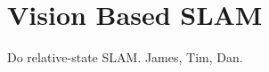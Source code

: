
\chapter{Vision Based SLAM}
\label{chap:visual_SLAM}

Do relative-state SLAM. James, Tim, Dan.


%
%
%
%